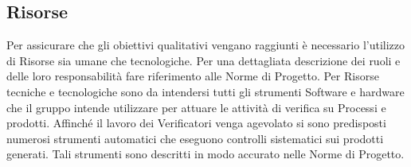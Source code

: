 \subsection{Risorse}{
Per assicurare che gli obiettivi qualitativi vengano raggiunti è necessario l’utilizzo di Risorse sia umane che tecnologiche. Per una dettagliata descrizione dei ruoli e delle loro responsabilità fare riferimento alle Norme di Progetto. Per Risorse tecniche e tecnologiche sono da intendersi tutti gli strumenti Software e hardware che il gruppo intende utilizzare per attuare le attività di verifica su Processi e prodotti. Affinché il lavoro dei Verificatori venga agevolato si sono predisposti numerosi strumenti automatici che eseguono controlli sistematici sui prodotti generati. Tali strumenti sono descritti in modo accurato nelle Norme di Progetto.
}